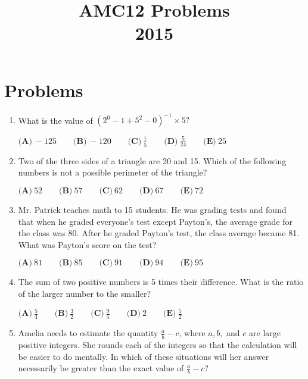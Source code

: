 \documentclass{article}
\title{AMC12 Problems \\ 2015}
\date{}
\begin{document}
\maketitle\thispagestyle{fancy}\newpage\section*{Problems}\begin{enumerate}[label=\arabic*., itemsep=0.5em]\item What is the value of \((2^0-1+5^2-0)^{-1}\times5?\)

\( \textbf{(A)}\ -125\qquad\textbf{(B)}\ -120\qquad\textbf{(C)}\ \frac{1}{5}\qquad\textbf{(D)}\ \frac{5}{24}\qquad\textbf{(E)}\ 25 \)\par \vspace{0.5em}\item Two of the three sides of a triangle are 20 and 15. Which of the following numbers is not a possible perimeter of the triangle?

\( \textbf{(A)}\ 52\qquad\textbf{(B)}\ 57\qquad\textbf{(C)}\ 62\qquad\textbf{(D)}\ 67\qquad\textbf{(E)}\ 72 \)\par \vspace{0.5em}\item Mr. Patrick teaches math to 15 students. He was grading tests and found that when he graded everyone's test except Payton's, the average grade for the class was 80. After he graded Payton's test, the class average became 81. What was Payton's score on the test?

\( \textbf{(A)}\ 81\qquad\textbf{(B)}\ 85\qquad\textbf{(C)}\ 91\qquad\textbf{(D)}\ 94\qquad\textbf{(E)}\ 95 \)\par \vspace{0.5em}\item The sum of two positive numbers is 5 times their difference. What is the ratio of the larger number to the smaller?

\( \textbf{(A)}\ \frac54 \qquad\textbf{(B)}\ \frac32 \qquad\textbf{(C)}\ \frac95 \qquad\textbf{(D)}\ 2 \qquad\textbf{(E)}\ \frac52 \)\par \vspace{0.5em}\item Amelia needs to estimate the quantity \(\frac{a}{b} - c\), where \(a, b,\) and \(c\) are large positive integers. She rounds each of the integers so that the calculation will be easier to do mentally. In which of these situations will her answer necessarily be greater than the exact value of \(\frac{a}{b} - c\)?


\end{enumerate}
\end{document}
